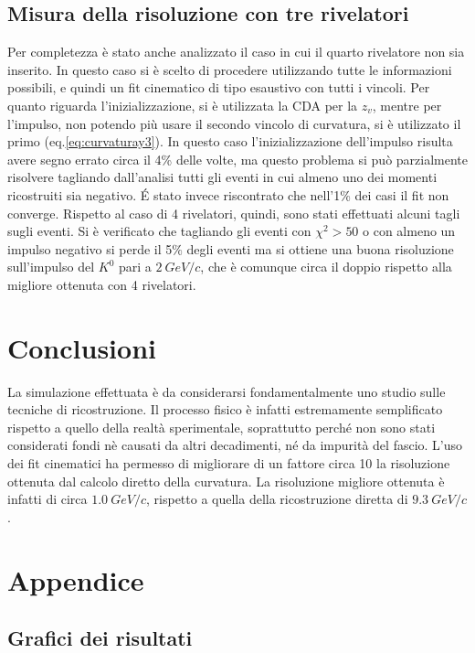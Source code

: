 \documentclass[8pt]{extarticle}
\begin{document}
\subsection{Misura della risoluzione con tre rivelatori}
Per completezza è stato anche analizzato il caso in cui il quarto rivelatore non sia inserito. In questo caso si è scelto di procedere utilizzando tutte le informazioni possibili, e quindi un fit cinematico di tipo esaustivo con tutti i vincoli. Per quanto riguarda l'inizializzazione, si è utilizzata la CDA per la $z_v$, mentre per l'impulso, non potendo più usare il secondo vincolo di curvatura, si è utilizzato il primo (eq.\ref{eq:curvaturay3}). In questo caso l'inizializzazione dell'impulso risulta avere segno errato circa il 4\% delle volte, ma questo problema si può parzialmente risolvere tagliando dall'analisi tutti gli eventi in cui almeno uno dei momenti ricostruiti sia negativo. \'E stato invece riscontrato che nell'1\% dei casi il fit non converge. Rispetto al caso di 4 rivelatori, quindi, sono stati effettuati alcuni tagli sugli eventi. Si è verificato che tagliando gli eventi con $\chi^2 > 50$ o con almeno un impulso negativo si perde il 5$\%$ degli eventi ma si ottiene una buona risoluzione sull'impulso del $K^0$ pari a $2\ GeV/c$, che è comunque circa il doppio rispetto alla migliore ottenuta con 4 rivelatori.


\section{Conclusioni} \label{sec:conclusioni}
La simulazione effettuata è da considerarsi fondamentalmente uno studio sulle tecniche di ricostruzione. Il processo fisico è infatti estremamente semplificato rispetto a quello della realtà sperimentale, soprattutto perché non sono stati considerati fondi nè causati da altri decadimenti, né da impurità del fascio. L'uso dei fit cinematici ha permesso di migliorare di un fattore circa 10 la risoluzione ottenuta dal calcolo diretto della curvatura. La risoluzione migliore ottenuta è infatti di circa $1.0\ GeV/c$, rispetto a quella della ricostruzione diretta di $9.3\ GeV/c$. 

\section{Appendice}
\subsection{Grafici dei risultati} \label{subsec:grafici}
\end{document}
